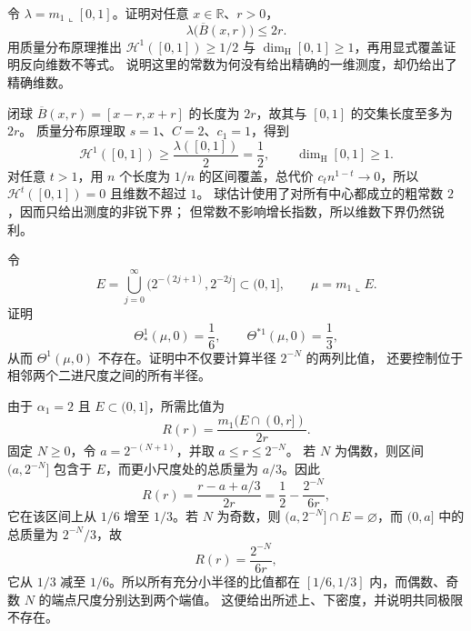 \begin{exercise}[一次质量分布估计]\label{b1:ex:15-basic-mass-distribution}
令 \(\lambda=m_1\llcorner[0,1]\)。证明对任意 \(x\in\mathbb R\)、\(r>0\)，
\[
 \lambda\bigl(\overline B(x,r)\bigr)\leq2r.
\]
用质量分布原理推出 \(\mathcal H^1([0,1])\geq1/2\) 与
\(\dim_{\mathrm H}[0,1]\geq1\)，再用显式覆盖证明反向维数不等式。
说明这里的常数为何没有给出精确的一维测度，却仍给出了精确维数。
\end{exercise}
\begin{solution}
闭球 \(\overline B(x,r)=[x-r,x+r]\) 的长度为 \(2r\)，故其与 \([0,1]\) 的交集长度至多为 \(2r\)。
质量分布原理取 \(s=1\)、\(C=2\)、\(c_1=1\)，得到
\[
 \mathcal H^1([0,1])\geq\frac{\lambda([0,1])}{2}=\frac12,
 \qquad \dim_{\mathrm H}[0,1]\geq1.
\]
对任意 \(t>1\)，用 \(n\) 个长度为 \(1/n\) 的区间覆盖，总代价
\(c_tn^{1-t}\to0\)，所以 \(\mathcal H^t([0,1])=0\) 且维数不超过 \(1\)。
球估计使用了对所有中心都成立的粗常数 \(2\)，因而只给出测度的非锐下界；
但常数不影响增长指数，所以维数下界仍然锐利。
\end{solution}

\begin{exercise}\label{b1:ex:15-basic-density-oscillation}
令
\[
 E=\bigcup_{j=0}^{\infty}\bigl(2^{-(2j+1)},2^{-2j}\bigr]\subset(0,1],
 \qquad \mu=m_1\llcorner E.
\]
证明
\[
 \Theta_*^1(\mu,0)=\frac16,
 \qquad
 \Theta^{*1}(\mu,0)=\frac13,
\]
从而 \(\Theta^1(\mu,0)\) 不存在。证明中不仅要计算半径 \(2^{-N}\) 的两列比值，
还要控制位于相邻两个二进尺度之间的所有半径。
\end{exercise}
\begin{solution}
由于 \(\alpha_1=2\) 且 \(E\subset(0,1]\)，所需比值为
\[
 R(r)=\frac{m_1(E\cap(0,r])}{2r}.
\]
固定 \(N\geq0\)，令 \(a=2^{-(N+1)}\)，并取 \(a\leq r\leq2^{-N}\)。
若 \(N\) 为偶数，则区间 \((a,2^{-N}]\) 包含于 \(E\)，而更小尺度处的总质量为 \(a/3\)。因此
\[
 R(r)=\frac{r-a+a/3}{2r}
 =\frac12-\frac{2^{-N}}{6r},
\]
它在该区间上从 \(1/6\) 增至 \(1/3\)。若 \(N\) 为奇数，则
\((a,2^{-N}]\cap E=\varnothing\)，而 \((0,a]\) 中的总质量为 \(2^{-N}/3\)，故
\[
 R(r)=\frac{2^{-N}}{6r},
\]
它从 \(1/3\) 减至 \(1/6\)。所以所有充分小半径的比值都在
\([1/6,1/3]\) 内，而偶数、奇数 \(N\) 的端点尺度分别达到两个端值。
这便给出所述上、下密度，并说明共同极限不存在。
\end{solution}

